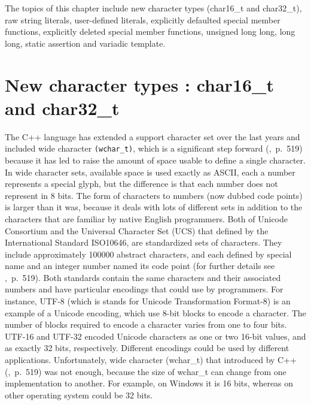 \documentclass[11pt]{report}
\begin{document}
The topics of this chapter include new character types (char16\_t and char32\_t), raw string literals, user-defined literals, explicitly defaulted special member functions, explicitly deleted special member functions, unsigned long long, long long, static assertion and variadic template.

\section{New character types : char16\_t and char32\_t}
\label{section: char16_t and char32_t}
The C++ language has extended a support character set over the last years and included wide character \texttt{(wchar\_t)}, which is a significant step forward (\cite{Gregorie:professionalcpp},~p.~519) because it has led to raise the amount of space usable to define a single character. In wide character sets, available space is used exactly as ASCII, each a number represents a special glyph, but the difference is that each number does not represent in 8 bits. The form of characters to numbers (now dubbed code points) is larger than it was, because it deals with lots of different sets in addition to the characters that are familiar by native English programmers. Both of Unicode Consortium and the Universal Character Set (UCS) that defined by the International Standard ISO10646, are standardized sets of characters. They include approximately 100000 abstract characters, and each defined by special name and an integer number named its code point (for further details see \cite{Gregorie:professionalcpp},~p.~519). Both standards contain the same characters and their associated numbers and have particular encodings that could use by programmers. For instance, UTF-8 (which is stands for Unicode Transformation Format-8) is an example of a Unicode encoding, which use 8-bit blocks to encode a character. The number of blocks required to encode a character varies from one to four bits. UTF-16 and UTF-32 encoded Unicode characters as one or two 16-bit values, and as exactly 32 bits, respectively. Different encodings could be used by different applications. Unfortunately, wide character (wchar\_t) that introduced by C++ (\cite{Gregorie:professionalcpp},~p.~519) was not enough, because the size of wchar\_t can change from one implementation to another. For example, on Windows it is 16 bits, whereas on other operating system could be 32 bits.
\end{document}
